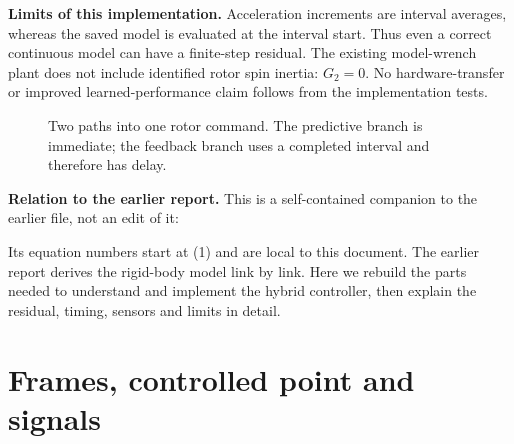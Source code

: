 \documentclass[11pt,a4paper]{article}
\newcommand{\vct}[1]{\boldsymbol{#1}}
\newcommand{\bv}[1]{{}^{b}\vct{#1}}
\begin{document}
\textbf{Limits of this implementation.} Acceleration increments are interval
averages, whereas the saved model is evaluated at the interval start. Thus even
a correct continuous model can have a finite-step residual. The existing
model-wrench plant does not include identified rotor spin inertia: $G_2=0$.
No hardware-transfer or improved learned-performance claim follows from the
implementation tests.

\begin{figure}[H]
\centering
{}
\caption{Two paths into one rotor command. The predictive branch is immediate;
the feedback branch uses a completed interval and therefore has delay.}
\label{fig:overview}
\end{figure}

\clearpage
\textbf{Relation to the earlier report.} This is a self-contained companion to the earlier file, not an edit of it:
\begin{quote}\small{}\end{quote}
Its equation numbers start at (1) and are local to this document. The earlier
report derives the rigid-body model link by link. Here we rebuild the parts
needed to understand and implement the hybrid controller, then explain the
residual, timing, sensors and limits in detail.

\begingroup\small\setcounter{tocdepth}{1}\tableofcontents\endgroup
\clearpage

\section{Frames, controlled point and signals}\label{sec:frames}
\end{document}

